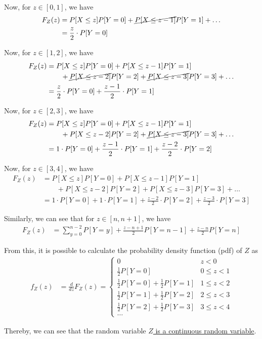 Now, for \( z \in [0, 1] \), we have
\begin{align*}
    F_{Z}(z)
     & =
    P[X \leq z] P[Y = 0]
    +
    \cancel{P[X \leq z-1]} P[Y = 1]
    +
    \ldots
    \\ & =
    \frac{z}{2} \cdot P[Y = 0]
\end{align*}

Now, for \( z \in [1, 2] \), we have
\begin{align*}
    F_{Z}(z)
     & =
    P[X \leq z] P[Y = 0]
    +
    P[X \leq z-1] P[Y = 1]
    \\ & \qquad +
    \cancel{P[X \leq z-2]} P[Y = 2]
    +
    \cancel{P[X \leq z-3]} P[Y = 3]
    +
    \ldots
    \\ & =
    \frac{z}{2} \cdot P[Y = 0]
    +
    \frac{z-1}{2} \cdot P[Y = 1]
\end{align*}

Now, for \( z \in [2, 3] \), we have
\begin{align*}
    F_{Z}(z)
     & =
    P[X \leq z] P[Y = 0]
    +
    P[X \leq z-1] P[Y = 1]
    \\ & \qquad +
    P[X \leq z-2] P[Y = 2]
    +
    \cancel{P[X \leq z-3]} P[Y = 3]
    +
    \ldots
    \\ & =
    1 \cdot P[Y = 0]
    +
    \frac{z-1}{2} \cdot P[Y = 1]
    +
    \frac{z-2}{2} \cdot P[Y = 2]
\end{align*}

Now, for \( z \in [3, 4] \), we have
\begin{align*}
    F_{Z}(z)
     & =
    P[X \leq z] P[Y = 0]
    +
    P[X \leq z-1] P[Y = 1]
    \\ & \qquad +
    P[X \leq z-2] P[Y = 2]
    +
    P[X \leq z-3] P[Y = 3]
    +
    \ldots
    \\ & =
    1 \cdot P[Y = 0]
    +
    1 \cdot P[Y = 1]
    +
    \frac{z-2}{2} \cdot P[Y = 2]
    +
    \frac{z-3}{2} \cdot P[Y = 3]
\end{align*}

Similarly, we can see that for \( z \in [n, n+1] \), we have
\begin{align*}
    F_{Z}(z)
     & =
    \sum_{y=0}^{n-2} P[Y = y]
    +
    \frac{z-n+1}{2} P[Y = n-1]
    +
    \frac{z-n}{2} P[Y = n]
\end{align*}

From this, it is possible to calculate the probability density function (pdf) of \( Z \) as
\begin{align*}
    f_{Z}(z)
     & =
    \frac{d}{dz} F_{Z}(z)
    =
    \begin{cases}
        0                                           & z < 0        \\
        \frac{1}{2} P[Y = 0]                        & 0 \leq z < 1 \\
        \frac{1}{2} P[Y = 0] + \frac{1}{2} P[Y = 1] & 1 \leq z < 2 \\
        \frac{1}{2} P[Y = 1] + \frac{1}{2} P[Y = 2] & 2 \leq z < 3 \\
        \frac{1}{2} P[Y = 2] + \frac{1}{2} P[Y = 3] & 3 \leq z < 4 \\
        \ldots
    \end{cases}
\end{align*}

Thereby, we can see that the random variable \underline{\( Z \) is a continuous random variable}.
